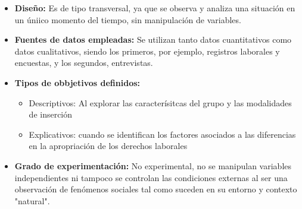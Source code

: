 \documentclass{article}
\begin{document}
\begin{itemize}
	\item \textbf{Diseño:} Es de tipo transversal, ya que se observa y analiza una situación en un úniico momento del tiempo, sin manipulación de variables.
	\item \textbf{Fuentes de datos empleadas:} Se utilizan tanto datos cuantitativos como datos cualitativos, siendo los primeros, por ejemplo, registros laborales y encuestas, y los segundos, entrevistas.
	\item \textbf{Tipos de obbjetivos definidos:}
		\begin{itemize}
			\item Descriptivos: Al explorar las caracterísitcas del grupo y las modalidades de inserción
			\item Explicativos: cuando se identifican los factores asociados a las diferencias en la apropriación de los derechos laborales
		\end{itemize}
	\item \textbf{Grado de experimentación:} No experimental, no se manipulan variables independientes ni tampoco se controlan las condiciones externas al ser una observación de fenómenos sociales tal como suceden en su entorno y contexto "natural".
\end{itemize}

\end{document}
